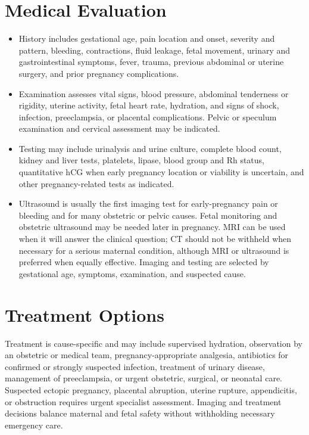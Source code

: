 \section*{Medical Evaluation}
\begin{itemize}
  \item History includes gestational age, pain location and onset, severity and pattern, bleeding, contractions, fluid leakage, fetal movement, urinary and gastrointestinal symptoms, fever, trauma, previous abdominal or uterine surgery, and prior pregnancy complications.
  \item Examination assesses vital signs, blood pressure, abdominal tenderness or rigidity, uterine activity, fetal heart rate, hydration, and signs of shock, infection, preeclampsia, or placental complications. Pelvic or speculum examination and cervical assessment may be indicated.
  \item Testing may include urinalysis and urine culture, complete blood count, kidney and liver tests, platelets, lipase, blood group and Rh status, quantitative hCG when early pregnancy location or viability is uncertain, and other pregnancy-related tests as indicated.
  \item Ultrasound is usually the first imaging test for early-pregnancy pain or bleeding and for many obstetric or pelvic causes. Fetal monitoring and obstetric ultrasound may be needed later in pregnancy. MRI can be used when it will answer the clinical question; CT should not be withheld when necessary for a serious maternal condition, although MRI or ultrasound is preferred when equally effective. Imaging and testing are selected by gestational age, symptoms, examination, and suspected cause.
\end{itemize}

\section*{Treatment Options}
Treatment is cause-specific and may include supervised hydration, observation by an obstetric or medical team, pregnancy-appropriate analgesia, antibiotics for confirmed or strongly suspected infection, treatment of urinary disease, management of preeclampsia, or urgent obstetric, surgical, or neonatal care. Suspected ectopic pregnancy, placental abruption, uterine rupture, appendicitis, or obstruction requires urgent specialist assessment. Imaging and treatment decisions balance maternal and fetal safety without withholding necessary emergency care.


